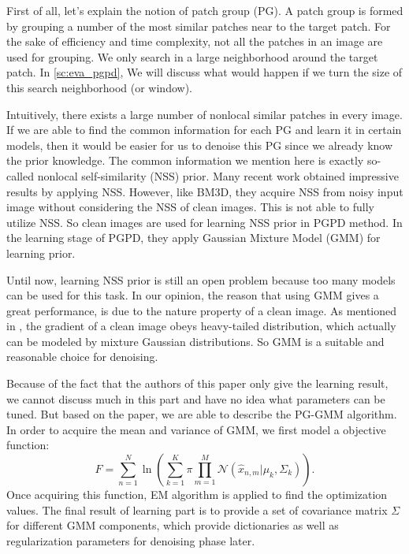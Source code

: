 First of all, let's explain the notion of patch group (PG). A patch group is formed by grouping a number of the most similar patches near to the target patch. For the sake of efficiency and time complexity, not all the patches in an image are used for grouping. We only search in a large neighborhood around the target patch. In \ref{sc:eva_pgpd}, We will discuss what would happen if we turn the size of this search neighborhood (or window).

Intuitively, there exists a large number of nonlocal similar patches in every image. If we are able to find the common information for each PG and learn it in certain models, then it would be easier for us to denoise this PG since we already know the prior knowledge. The common information we mention here is exactly so-called nonlocal self-similarity (NSS) prior. Many recent work obtained impressive results by applying NSS\cite{buades2005}\cite{gu2014weighted}\cite{dabov2007image}. However, like BM3D\cite{dabov2007image}, they acquire NSS from noisy input image without considering the NSS of clean images. This is not able to fully utilize NSS. So clean images are used for learning NSS prior in PGPD method. In the learning stage of PGPD, they apply Gaussian Mixture Model (GMM) for learning prior. 

Until now, learning NSS prior is still an open problem because too many models can be used for this task. In our opinion, the reason that using GMM gives a great performance, is due to the nature property of a clean image. As mentioned in \cite{fergus2006removing}, the gradient of a clean image obeys heavy-tailed distribution\cite{klebanov2003heavy}, which actually can be modeled by mixture Gaussian distributions. So GMM  is a suitable and reasonable choice for denoising.

Because of the fact that the authors of this paper only give the learning result, we cannot discuss much in this part and have no idea what parameters can be tuned. But based on the paper, we are able to describe the PG-GMM algorithm. In order to acquire the mean and variance of GMM, we first model a objective function:
\begin{equation}
	F = \sum_{n=1}^{N}\ln(\sum_{k=1}^{K}\pi \prod_{m=1}^{M}\mathcal{N}(\hat{x}_{n,m}|\mu_k,\Sigma_k)).
	\label{eq:pgpd_gmm}
\end{equation}
Once acquiring this function, EM algorithm\cite{dempster1977maximum} is applied to find the optimization values. The final result of learning part is to provide a set of covariance matrix $\Sigma$ for different GMM components, which provide dictionaries as well as regularization parameters for denoising phase later.

